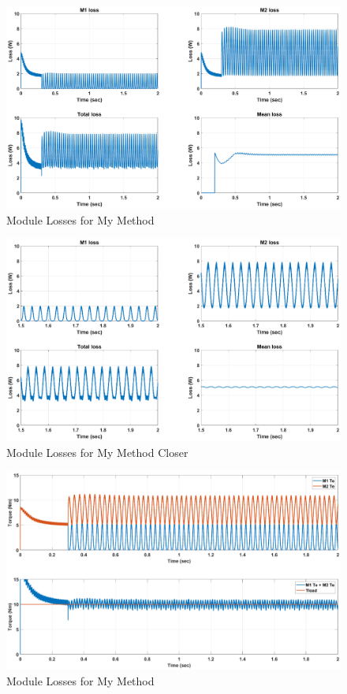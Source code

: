 \documentclass{article}
\begin{document}
\begin{figure}[H]
\centering
\includegraphics[scale=0.35]{SimulationResults/MyMethod/Loss.eps}
\caption{Module Losses for My Method}
\label{fig:LossMyMethod}
\end{figure}

\begin{figure}[H]
\centering
\includegraphics[scale=0.35]{SimulationResults/MyMethod/Loss_closer.eps}
\caption{Module Losses for My Method Closer}
\label{fig:LossMyMethodCloser}
\end{figure}

\begin{figure}[H]
\centering
\includegraphics[scale=0.35]{SimulationResults/MyMethod/Torques.eps}
\caption{Module Losses for My Method}
\label{fig:LossMyMethod}
\end{figure}




\end{document}
